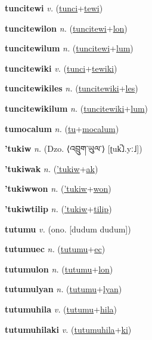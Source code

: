 \textbf{\hypertarget{tuncitewi}{tuncitewi}} \textit{v.} (\hyperlink{tunci}{tunci}+\allowbreak \hyperlink{tewi}{tewi})


\textbf{\hypertarget{tuncitewilon}{tuncitewilon}} \textit{n.} (\hyperlink{tuncitewi}{tuncitewi}+\allowbreak \hyperlink{lon}{lon})


\textbf{\hypertarget{tuncitewilum}{tuncitewilum}} \textit{n.} (\hyperlink{tuncitewi}{tuncitewi}+\allowbreak \hyperlink{lum}{lum})


\textbf{\hypertarget{tuncitewiki}{tuncitewiki}} \textit{v.} (\hyperlink{tunci}{tunci}+\allowbreak \hyperlink{tewiki}{tewiki})


\textbf{\hypertarget{tuncitewikiles}{tuncitewikiles}} \textit{n.} (\hyperlink{tuncitewiki}{tuncitewiki}+\allowbreak \hyperlink{les}{les})


\textbf{\hypertarget{tuncitewikilum}{tuncitewikilum}} \textit{n.} (\hyperlink{tuncitewiki}{tuncitewiki}+\allowbreak \hyperlink{lum}{lum})


\textbf{\hypertarget{tumocalum}{tumocalum}} \textit{n.} (\hyperlink{tu}{tu}+\allowbreak \hyperlink{mocalum}{mocalum})


\textbf{\hypertarget{'tukiw}{'tukiw}} \textit{n.} (Dzo. ⟨{\tibetan{}འབྲུག་ཡུལ་}⟩ [ʈuk̚˩.yː˩])


\textbf{\hypertarget{'tukiwak}{'tukiwak}} \textit{n.} (\hyperlink{'tukiw}{'tukiw}+\allowbreak \hyperlink{ak}{ak})


\textbf{\hypertarget{'tukiwwon}{'tukiwwon}} \textit{n.} (\hyperlink{'tukiw}{'tukiw}+\allowbreak \hyperlink{won}{won})


\textbf{\hypertarget{'tukiwtilip}{'tukiwtilip}} \textit{n.} (\hyperlink{'tukiw}{'tukiw}+\allowbreak \hyperlink{tilip}{tilip})


\textbf{\hypertarget{tutumu}{tutumu}} \textit{v.} (ono. [dudum dudum])


\textbf{\hypertarget{tutumuec}{tutumuec}} \textit{n.} (\hyperlink{tutumu}{tutumu}+\allowbreak \hyperlink{ec}{ec})


\textbf{\hypertarget{tutumulon}{tutumulon}} \textit{n.} (\hyperlink{tutumu}{tutumu}+\allowbreak \hyperlink{lon}{lon})


\textbf{\hypertarget{tutumulyan}{tutumulyan}} \textit{n.} (\hyperlink{tutumu}{tutumu}+\allowbreak \hyperlink{lyan}{lyan})


\textbf{\hypertarget{tutumuhila}{tutumuhila}} \textit{v.} (\hyperlink{tutumu}{tutumu}+\allowbreak \hyperlink{hila}{hila})


\textbf{\hypertarget{tutumuhilaki}{tutumuhilaki}} \textit{v.} (\hyperlink{tutumuhila}{tutumuhila}+\allowbreak \hyperlink{ki}{ki})


